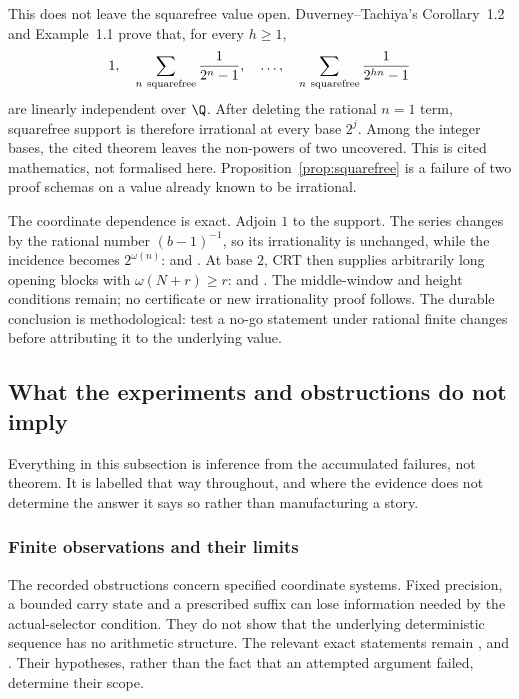 This does not leave the squarefree value open.  Duverney--Tachiya's
Corollary~1.2 and Example~1.1 prove that, for every $h\ge1$,
\[
  1,\quad
  \sum_{n\ {\rm squarefree}}\frac1{2^n-1},\quad\ldots,\quad
  \sum_{n\ {\rm squarefree}}\frac1{2^{hn}-1}
\]
are linearly independent over $\Q$.  After deleting the rational $n=1$
term, squarefree support is therefore irrational at every base $2^j$.
Among the integer bases, the cited theorem leaves the non-powers of two
uncovered.  This is cited mathematics, not formalised here.  Proposition~\ref{prop:squarefree}
is a failure of two proof schemas on a value already known to be irrational.

The coordinate dependence is exact.  Adjoin $1$ to the support.  The series
changes by the rational number $(b-1)^{-1}$, so its irrationality is
unchanged, while the incidence becomes $2^{\omega(n)}$:
and
.
At base $2$, CRT then supplies arbitrarily long opening blocks with
$\omega(N+r)\ge r$:
and
.
The middle-window and height conditions remain; no certificate or new
irrationality proof follows.  The durable conclusion is methodological:
test a no-go statement under rational finite changes before attributing it
to the underlying value.

\subsection{What the experiments and obstructions do not imply}
\label{sec:invent-shape}

Everything in this subsection is inference from the accumulated failures, not theorem. It is
labelled that way throughout, and where the evidence does not determine the answer it says so
rather than manufacturing a story.

\subsubsection*{Finite observations and their limits}
The recorded obstructions concern specified coordinate systems.  Fixed
precision, a bounded carry state and a prescribed suffix can lose
information needed by the actual-selector condition.  They do not show
that the underlying deterministic sequence has no arithmetic structure.
The relevant exact statements remain
,
and
.
Their hypotheses, rather than the fact that an attempted argument failed,
determine their scope.

